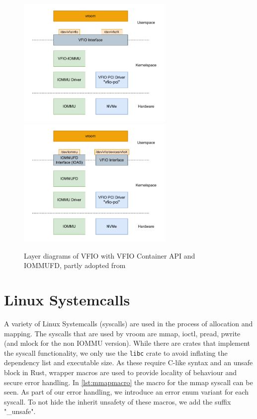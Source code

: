 \begin{figure}[H]
    \centering
     {\includegraphics[width=0.67\textwidth]{figures/VFIOLayer.pdf}}
     {\includegraphics[width=0.67\textwidth]{figures/IOMMUFDLayer.pdf}}
    \caption{Layer diagrams of VFIO with VFIO Container API and IOMMUFD, partly adopted from \cite{dpdkiommufd}}
    \label{fig:layer}
\end{figure}

\section{Linux Systemcalls}
A variety of Linux Systemcalls (syscalls) are used in the process of allocation and mapping. The syscalls that are used by vroom are mmap, ioctl, pread, pwrite (and mlock for the non IOMMU version). While there are crates that implement the syscall functionality, we only use the \texttt{libc} crate to avoid inflating the dependency list and executable size. As these require C-like syntax and an unsafe block in Rust, wrapper macros are used to provide locality of behaviour and secure error handling. In \autoref{lst:mmapmacro} the macro for the mmap syscall can be seen.
As part of our error handling, we introduce an error enum variant for each syscall. To not hide the inherit unsafety of these macros, we add the suffix "\_unsafe".


